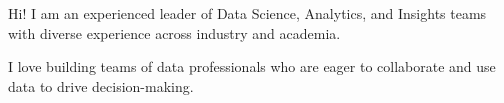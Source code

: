\begin {cvsummary}

Hi! I am an experienced leader of Data Science, Analytics, and Insights teams with diverse experience across industry and academia.

I love building teams of data professionals who are eager to collaborate and use data to drive decision-making.

\vspace{1mm}
\end {cvsummary}
